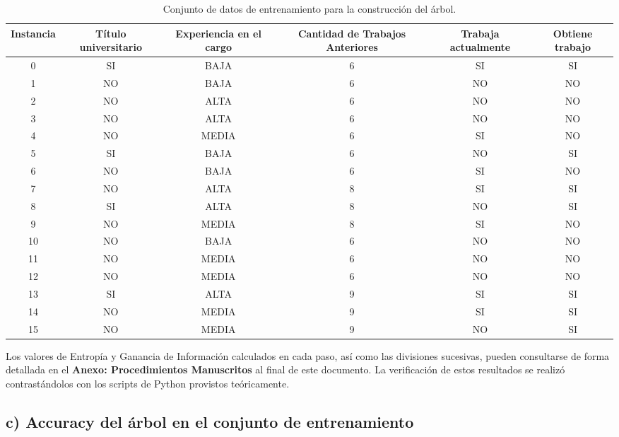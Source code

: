 \documentclass[11pt,a4paper]{article}
\begin{document}
\begin{table}[H]
\centering
\begin{adjustbox}{width=0.9\textwidth}
\begin{tabular}{|c|c|c|c|c|c|}
\hline
\textbf{Instancia} & \textbf{Título universitario} & \textbf{Experiencia en el cargo} & \textbf{Cantidad de Trabajos Anteriores} & \textbf{Trabaja actualmente} & \textbf{Obtiene trabajo} \\ \hline
0 & SI & BAJA & 6 & SI & SI \\ \hline
1 & NO & BAJA & 6 & NO & NO \\ \hline
2 & NO & ALTA & 6 & NO & NO \\ \hline
3 & NO & ALTA & 6 & NO & NO \\ \hline
4 & NO & MEDIA & 6 & SI & NO \\ \hline
5 & SI & BAJA & 6 & NO & SI \\ \hline
6 & NO & BAJA & 6 & SI & NO \\ \hline
7 & NO & ALTA & 8 & SI & SI \\ \hline
8 & SI & ALTA & 8 & NO & SI \\ \hline
9 & NO & MEDIA & 8 & SI & NO \\ \hline
10 & NO & BAJA & 6 & NO & NO \\ \hline
11 & NO & MEDIA & 6 & NO & NO \\ \hline
12 & NO & MEDIA & 6 & NO & NO \\ \hline
13 & SI & ALTA & 9 & SI & SI \\ \hline
14 & NO & MEDIA & 9 & SI & SI \\ \hline
15 & NO & MEDIA & 9 & NO & SI \\ \hline
\end{tabular}
\end{adjustbox}
\caption{Conjunto de datos de entrenamiento para la construcción del árbol.}
\end{table}

Los valores de Entropía y Ganancia de Información calculados en cada paso, así como las divisiones sucesivas, pueden consultarse de forma detallada en el \textbf{Anexo: Procedimientos Manuscritos} al final de este documento. La verificación de estos resultados se realizó contrastándolos con los scripts de Python provistos teóricamente.

\subsection*{c) Accuracy del árbol en el conjunto de entrenamiento}
\end{document}
